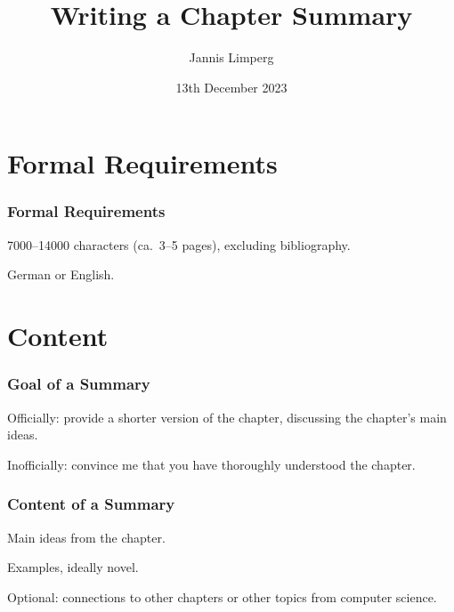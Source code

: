 \documentclass[xetex]{beamer}
\begin{document}
\title{Writing a Chapter Summary}
\author{Jannis Limperg}
\date{13th December 2023}

\begin{frame}
  \maketitle
\end{frame}

\begin{frame}
  \tableofcontents[hideallsubsections]
\end{frame}

\section{Formal Requirements}

\begin{frame}
  \frametitle{Formal Requirements}

  7000--14000 characters (ca.\ 3--5 pages), excluding bibliography.

  \medskip
  \pause

  German or English.
\end{frame}

\section{Content}

\begin{frame}
  \frametitle{Goal of a Summary}

  Officially: provide a shorter version of the chapter, discussing the chapter's main ideas.

  \medskip
  \pause

  Inofficially: convince me that you have thoroughly understood the chapter.
\end{frame}

\begin{frame}
  \frametitle{Content of a Summary}

  Main ideas from the chapter.

  \medskip
  \pause

  Examples, ideally novel.

  \medskip
  \pause

  Optional: connections to other chapters or other topics from computer science.
\end{frame}
\end{document}
